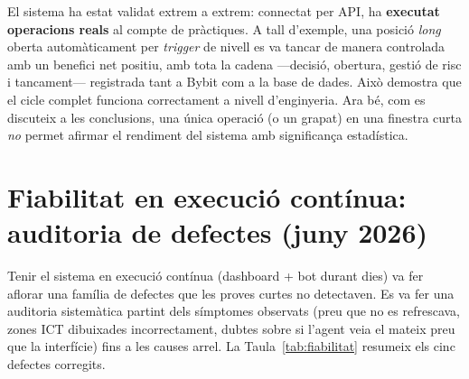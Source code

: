 \documentclass[12pt, a4paper]{report}
\begin{document}
El sistema ha estat validat extrem a extrem: connectat per API, ha \textbf{executat operacions reals} al compte de pràctiques. A tall d'exemple, una posició \textit{long} oberta automàticament per \textit{trigger} de nivell es va tancar de manera controlada amb un benefici net positiu, amb tota la cadena ---decisió, obertura, gestió de risc i tancament--- registrada tant a Bybit com a la base de dades. Això demostra que el cicle complet funciona correctament a nivell d'enginyeria. Ara bé, com es discuteix a les conclusions, una única operació (o un grapat) en una finestra curta \emph{no} permet afirmar el rendiment del sistema amb significança estadística.

\section{Fiabilitat en execució contínua: auditoria de defectes (juny 2026)}
\label{sec:fiabilitat}

Tenir el sistema en execució contínua (dashboard + bot durant dies) va fer aflorar una família de defectes que les proves curtes no detectaven. Es va fer una auditoria sistemàtica partint dels símptomes observats (preu que no es refrescava, zones ICT dibuixades incorrectament, dubtes sobre si l'agent veia el mateix preu que la interfície) fins a les causes arrel. La Taula~\ref{tab:fiabilitat} resumeix els cinc defectes corregits.
\end{document}
